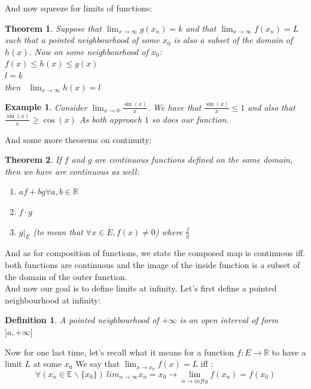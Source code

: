 \documentclass[titlepage]{article}
\newtheorem{theorem}{Theorem}[section]
\newtheorem{definition}{Definition}
\newtheorem{example}{Example}[section]
\begin{document}
And now squeeze for limits of functions:

\begin{theorem}
Suppose that $\lim_{x \to \infty} g(x_{n}) = k$ and that $\lim_{x \to \infty} f(x_{n}) = L$ such that a pointed neighbourhood of some $x_{0}$ is also a subset of the domain of $h(x)$. Now on some neighbourhood of $x_{0}$:
\\
$f(x) \leq h(x) \leq g(x)$\\
$l = k$
\\
then \ $\lim_{x \to \infty}h(x) = l$
\end{theorem}

\begin{example}
Consider $\lim_{x \to 0} \frac{\sin(x)}{x}$. We have that $\frac{\sin(x)}{x} \leq 1$ and also that $\frac{\sin(x)}{x}\geq \cos(x)$ As both approach $1$ so does our function. 
\end{example}

And some more theorems on continuity:
\begin{theorem}
If $f$ and $g$ are continuous functions defined on the same domain, then we have are continuous as well:
\begin{enumerate}
    \item $af + bg \forall a,b \in \mathbb{R}$
    \item $f\cdot g$
    \item $g|_{E}$ (to mean that $\forall x \in E, f(x) \not = 0$) where $\frac{f}{g}$
\end{enumerate}
\end{theorem}

And as for composition of functions, we state the composed map is continuous iff. both functions are continuous and the image of the inside function is a subset of the domain of the outer function.
\\

And now our goal is to define limits at infinity. Let's first define a pointed neighbourhood at infinity:

\begin{definition}
A pointed neighbourhood of $+\infty$ is an open interval of form $]a,+\infty[$
\end{definition}

Now for one last time, let's recall what it means for a function $f:E \to \mathbb{R}$ to have a limit $L$ at some $x_{0}$ We say that $\lim_{x\to x_{0}} f(x) = L$ iff :
$$ \forall (x_{n} \in \mathbb{E}\backslash\{x_{0}\}) \ lim_{n \to \infty}x_{n} = x_{0} \rightarrow \lim_{n \to infty} f(x_{n}) = f(x_{0})$$
\end{document}
